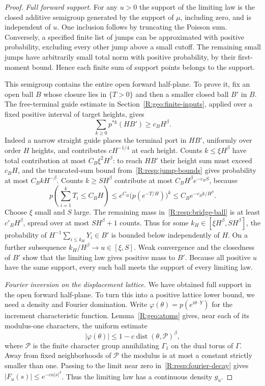 \begin{proof}
\emph{Full forward support.} For any $u>0$ the support of the limiting law is the closed additive semigroup generated by the support of $\mu$, including zero, and is independent of $u$. One inclusion follows by truncating the Poisson sum. Conversely, a specified finite list of jumps can be approximated with positive probability, excluding every other jump above a small cutoff. The remaining small jumps have arbitrarily small total norm with positive probability, by their first-moment bound. Hence each finite sum of support points belongs to the support.

This semigroup contains the entire open forward half-plane. To prove it, fix an open ball $B$ whose closure lies in $\{T>0\}$ and then a smaller closed ball $B'$ in $B$. The free-terminal guide estimate in Section~\ref{R:geo:finite-inputs}, applied over a fixed positive interval of target heights, gives
\begin{equation}
 \sum_{k\ge0}p^{*k}(HB')\ge c_B H^\beta.
 \label{R:resp:bridge-ball}
\end{equation}
Indeed a narrow straight guide places the terminal port in $HB'$, uniformly over order $H$ heights, and contributes $cH^{-1/4}$ at each height. Counts $k\le\xi H^\beta$ have total contribution at most $C_B\xi^2H^\beta$: to reach $HB'$ their height sum must exceed $c_BH$, and the truncated-sum bound from~\eqref{R:resp:jump-bounds} gives probability at most $C_B kH^{-\beta}$. Counts $k\ge S H^\beta$ contribute at most $C_BH^\beta e^{-c_BS}$, because
\[
 p\left(\sum_{i=1}^kT_i\le C_BH\right)
 \le e^{C_B}\bigl(p(e^{-T/H})\bigr)^k
 \le C_Be^{-c_B k/H^\beta}.
\]
Choose $\xi$ small and $S$ large. The remaining mass in~\eqref{R:resp:bridge-ball} is at least $c'_BH^\beta$, spread over at most $SH^\beta+1$ counts. Thus for some $k_H\in[\xi H^\beta,SH^\beta]$, the probability of $H^{-1}\sum_{i\le k_H}Y_i\in B'$ is bounded below independently of $H$. On a further subsequence $k_H/H^\beta\to u\in[\xi,S]$. Weak convergence and the closedness of $B'$ show that the limiting law gives positive mass to $B'$. Because all positive $u$ have the same support, every such ball meets the support of every limiting law.

\emph{Fourier inversion on the displacement lattice.} We have obtained full support in the open forward half-plane. To turn this into a positive lattice lower bound, we need a density and Fourier domination. Write $\varphi(\theta)=p(e^{i\theta\cdot Y})$ for the increment characteristic function. Lemma~\ref{R:geo:atoms} gives, near each of its modulus-one characters, the uniform estimate
\begin{equation}
 |\varphi(\theta)|\le 1-c\operatorname{dist}(\theta,\mathcal P)^\beta,
 \label{R:resp:fourier-decay}
\end{equation}
where $\mathcal P$ is the finite character group annihilating $\Gamma_1$ on the dual torus of $\Gamma$. Away from fixed neighborhoods of $\mathcal P$ the modulus is at most a constant strictly smaller than one. Passing to the limit near zero in~\eqref{R:resp:fourier-decay} gives $|F_u(s)|\le e^{-cu|s|^\beta}$. Thus the limiting law has a continuous density $g_u$.


\end{proof}

